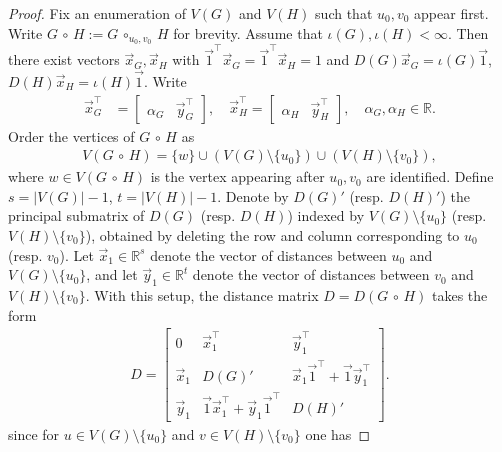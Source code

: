 \documentclass[10pt,a4paper]{amsart}
\newcommand{\Circ}{\circ}
\newcommand{\distmatrix}{D}
\newcommand{\one}{\vec{1}}
\newcommand{\x}{\vec{x}}
\newcommand{\y}{\vec{y}}
\begin{document}
    \begin{proof}
        Fix an enumeration of $V(G)$ and $V(H)$ such that $u_0, v_0$ appear first. Write $G\,\Circ\, H := G\,\Circ_{u_{0},v_{0}}\,H$ for brevity. Assume that $\iota(G),\iota(H)<\infty$. Then there exist vectors $\x_G,\x_H$ with $\one^\top\x_G = \one^\top\x_H = 1$ and $\distmatrix(G)\x_G = \iota(G)\one$, $\distmatrix(H)\x_H = \iota(H)\one$. Write
            \begin{align*}
                \x_G^\top &= \begin{bmatrix}
                    \alpha_G & \y_G^\top
                \end{bmatrix},\quad \x_H^\top = \begin{bmatrix}
                    \alpha_H & \y_H^\top
                \end{bmatrix}, \quad \alpha_G,\alpha_H\in\mathbb{R}.
            \end{align*}
        Order the vertices of $G\,\Circ\,H$ as
            \begin{align*}
                V(G\,\Circ\,H) = \{w\} \cup (V(G)\setminus \{u_{0}\} )\cup (V(H)\setminus \{v_{0}\}),
            \end{align*}
        where $w\in V(G\,\Circ\,H)$ is the vertex appearing after $u_0, v_0$ are identified. Define $s = |V(G)| - 1$, $t = |V(H)| - 1$. Denote by ${\distmatrix(G)}'$ (resp. ${\distmatrix(H)}'$) the principal submatrix of ${\distmatrix(G)}$ (resp. ${\distmatrix(H)}$) indexed by $V(G)\setminus \{u_{0}\}$ (resp. $V(H)\setminus \{v_{0}\}$), obtained by deleting the row and column corresponding to $u_{0}$ (resp. $v_{0}$). Let $\x_{1}\in\mathbb{R}^{s}$ denote the vector of distances between $u_{0}$ and $V(G)\setminus \{u_{0}\}$, and let $\y_{1}\in\mathbb{R}^{t}$ denote the vector of distances between $v_{0}$ and $V(H)\setminus \{v_{0}\}$. With this setup, the distance matrix $\distmatrix = \distmatrix(G\,\Circ\,H)$ takes the form
            \begin{align}\label{eq:d-decomp}
                \distmatrix = \begin{bmatrix}
                    0 & \x_{1}^\top & \y_{1}^\top\\
                    \x_{1} & {\distmatrix(G)}' & \x_{1}\one^\top + \one \y_{1}^\top\\
                    \y_{1} & \one \x_{1}^\top + \y_{1}\one^\top & {\distmatrix(H)}'
                \end{bmatrix}.
            \end{align}
        since for $u\in V(G)\setminus\{u_{0}\}$ and $v\in V(H)\setminus\{v_{0}\}$ one has

\end{proof}
\end{document}
